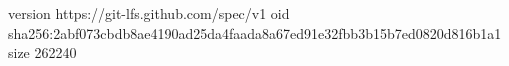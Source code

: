 version https://git-lfs.github.com/spec/v1
oid sha256:2abf073cbdb8ae4190ad25da4faada8a67ed91e32fbb3b15b7ed0820d816b1a1
size 262240
